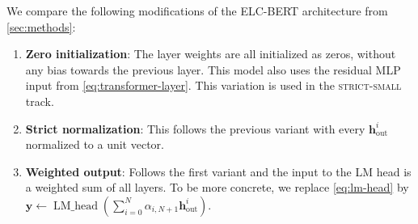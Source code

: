 We compare the following modifications of the ELC-BERT architecture from \cref{sec:methods}:
\begin{enumerate}
    \item \textbf{Zero initialization}: The layer weights are all initialized as zeros, without any bias towards the previous layer. This model also uses the residual MLP input from \cref{eq:transformer-layer}. This variation is used in the \textsc{strict-small} track. %
    \item \textbf{Strict normalization}: This follows the previous variant with every $\bm{h}^i_{\text{out}}$ normalized to a unit vector. %
    \item \textbf{Weighted output}: Follows the first variant and the input to the LM head is a weighted sum of all layers. To be more concrete, we replace \cref{eq:lm-head} by $\bm{y} \gets \operatorname{LM\_head}\!\left(\sum^{N}_{i=0}{\alpha_{i,N+1} \bm{h}^i_{\text{out}}}\right)$. %
\end{enumerate}

\begin{table}
\caption{\label{tab:res_elc}
Results for the BabyLM challenge suite of evaluation datasets. We compare the performance of different variants of our model to the one submitted to the BabyLM challenge as well as the backbone model LTG-BERT on the \textsc{strict} dataset.
}
\end{table}

